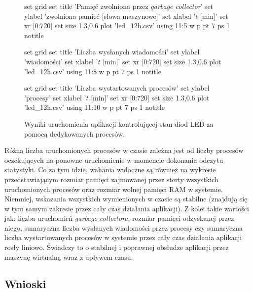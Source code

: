 \begin{figure}
\begin{gnuplot}[terminal=epslatex,terminaloptions=color]
	set grid
	set title 'Pamięć zwolniona przez \emph{garbage collector}'
	set ylabel 'zwolniona pamięć [słowa maszynowe]'
	set xlabel '$t$ [min]'
	set xr [0:720]
	set size 1.3,0.6
	plot 'led_12h.csv' using 11:5 w p pt 7 ps 1 notitle
\end{gnuplot}

\begin{gnuplot}[terminal=epslatex,terminaloptions=color]
	set grid
	set title 'Liczba wysłanych wiadomości'
	set ylabel 'wiadomości'
	set xlabel '$t$ [min]'
	set xr [0:720]
	set size 1.3,0.6
	plot 'led_12h.csv' using 11:8 w p pt 7 ps 1 notitle
\end{gnuplot}

\begin{gnuplot}[terminal=epslatex,terminaloptions=color]
	set grid
	set title 'Liczba wystartowanych procesów'
	set ylabel 'procesy'
	set xlabel '$t$ [min]'
	set xr [0:720]
	set size 1.3,0.6
	plot 'led_12h.csv' using 11:10 w p pt 7 ps 1 notitle
\end{gnuplot}

\caption{Wyniki uruchomienia aplikacji kontrolującej stan diod LED za pomocą dedykowanych procesów.}
\label{fig:ledGraphs}

\end{figure}

Różna liczba uruchomionych procesów w czasie zależna jest od liczby procesów oczekujących na ponowne uruchomienie w momencie dokonania odczytu statystyki.
Co za tym idzie, wahania widoczne są również na wykresie przedstawiającym rozmiar pamięci zajmowanej przez sterty wszystkich uruchomionych procesów oraz rozmiar wolnej pamięci RAM w systemie.
Niemniej, wskazania wszystkich wymienionych w czasie są stabilne (znajdują się w tym samym zakresie przez cały czas działania aplikacji).
Z kolei takie wartości jak: liczba uruchomień \emph{garbage collectora}, rozmiar pamięci odzyskanej przez niego, sumaryczna liczba wysłanych wiadomości przez procesy czy sumaryczna liczba wystartowanych procesów w systemie przez cały czas działania aplikacji rosły liniowo.
Świadczy to o stabilnej i poprawnej obsłudze aplikacji przez maszynę wirtualną wraz z upływem czasu.

\subsection{Wnioski}

